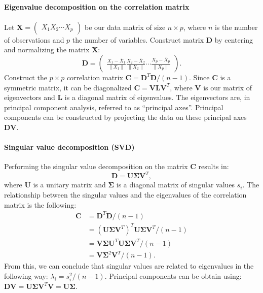 \paragraph{Eigenvalue decomposition on the correlation matrix}
Let $\mathbf{X} = \begin{pmatrix}X_1 X_2 \cdots X_p \end{pmatrix}$ be our data matrix of size $n \times p$, where $n$ is the number of observations and $p$ the number of variables. Construct matrix $\mathbf{D}$ by centering and normalizing the matrix $\mathbf{X}$:
\begin{equation}
	\mathbf{D} = \begin{pmatrix}
			\frac{X_1 - \bar{X}_1}{\lVert X_1 \rVert} \frac{X_2 - \bar{X}_2}{\lVert X_2 \rVert} \cdots \frac{X_p - \bar{X}_p}{\lVert X_p \rVert} 
		\end{pmatrix}.
\end{equation}
Construct the $p \times p$ correlation matrix $\mathbf{C} = \mathbf{D}^T\mathbf{D} / (n - 1)$. Since $\mathbf{C}$ is a symmetric matrix, it can be diagonalized $\mathbf{C} = \mathbf{V}\mathbf{L}\mathbf{V}^T$, where $\mathbf{V}$ is our matrix of eigenvectors and $\mathbf{L}$ is a diagonal matrix of eigenvalues. The eigenvectors are, in principal component analysis, referred to as \enquote{principal axes}. Principal components can be constructed by projecting the data on these principal axes $\mathbf{D}\mathbf{V}$.

\paragraph{Singular value decomposition (SVD)}
Performing the singular value decomposition on the matrix $\mathbf{C}$ results in:
\begin{equation}
	\mathbf{D} = \mathbf{U}\mathbf{\Sigma}\mathbf{V}^T,
\end{equation}
where $\mathbf{U}$ is a unitary matrix and $\mathbf{\Sigma}$ is a diagonal matrix of singular values $s_i$. The relationship between the singular values and the eigenvalues of the correlation matrix is the following:
\begin{equation}
\begin{aligned}
	\mathbf{C} &= \mathbf{D}^T\mathbf{D} / (n - 1) \\
	&= (\mathbf{U}\mathbf{\Sigma}\mathbf{V}^T)^T\mathbf{U}\mathbf{\Sigma}\mathbf{V}^T / (n - 1) \\
	&= \mathbf{V}\mathbf{\Sigma}\mathbf{U}^T\mathbf{U}\mathbf{\Sigma}\mathbf{V}^T / (n - 1) \\
	&= \mathbf{V}\mathbf{\Sigma}^2\mathbf{V}^T / (n - 1).
\end{aligned}
\end{equation}
From this, we can conclude that singular values are related to eigenvalues in the following way: $\lambda_i = s_i^2 / (n-1)$. Principal components can be obtain using: $\mathbf{D}\mathbf{V} = \mathbf{U}\mathbf{\Sigma}\mathbf{V}^T\mathbf{V} = \mathbf{U}\mathbf{\Sigma}$.

